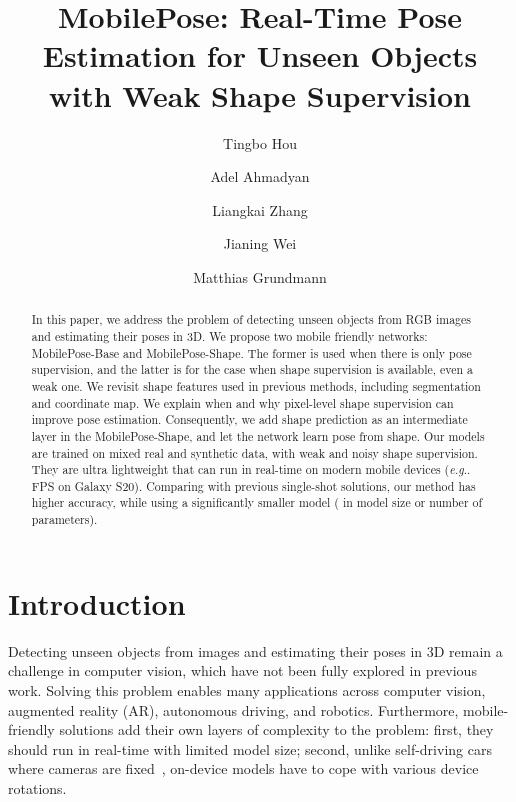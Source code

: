 \documentclass[runningheads]{llncs}
\makeatletter
\DeclareRobustCommand\onedot{\futurelet\@let@token\@onedot}
\def\@onedot{\ifx\@let@token.\else.\null\fi\xspace}
\def\eg{\emph{e.g}\onedot} \def\Eg{\emph{E.g}\onedot}
\makeatother
\begin{document}
\pagestyle{headings}
\mainmatter
\def\ECCVSubNumber{****}  

\title{MobilePose: Real-Time Pose Estimation for Unseen Objects with Weak Shape Supervision} 

\begin{comment}
\titlerunning{ECCV-20 submission ID \ECCVSubNumber} 
\authorrunning{ECCV-20 submission ID \ECCVSubNumber} 
\author{Anonymous ECCV submission}
\institute{Paper ID \ECCVSubNumber}
\end{comment}


\author{Tingbo Hou \and
Adel Ahmadyan \and
Liangkai Zhang \and
Jianing Wei \and
Matthias Grundmann}
\maketitle

\begin{abstract}
In this paper, we address the problem of detecting unseen objects from RGB images and estimating their poses in 3D. We propose two mobile friendly networks: MobilePose-Base and MobilePose-Shape. The former is used when there is only pose supervision, and the latter is for the case when shape supervision is available, even a weak one. We revisit shape features used in previous methods, including segmentation and coordinate map. We explain when and why pixel-level shape supervision can improve pose estimation. Consequently, we add shape prediction as an intermediate layer in the MobilePose-Shape, and let the network learn pose from shape. Our models are trained on mixed real and synthetic data, with weak and noisy shape supervision. They are ultra lightweight that can run in real-time on modern mobile devices (\eg 36 FPS on Galaxy S20). Comparing with previous single-shot solutions, our method has higher accuracy, while using a significantly smaller model ( in model size or number of parameters).

\end{abstract}


\section{Introduction}

Detecting unseen objects from images and estimating their poses in 3D remain a challenge in computer vision, which have not been fully explored in previous work. Solving this problem enables many applications across computer vision, augmented reality (AR), autonomous driving, and robotics. Furthermore, mobile-friendly solutions add their own layers of complexity to the problem: first, they should run in real-time with limited model size; second, unlike self-driving cars where cameras are fixed~\cite{Mousavian_2017_BBox,Dijk_2019_Depth}, on-device models have to cope with various device rotations.
\end{document}
